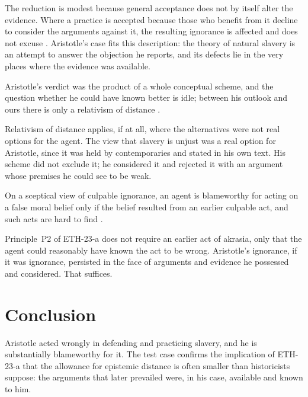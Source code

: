 \documentclass{situationist-preprint}
\begin{document}
The reduction is modest because general acceptance does not by itself alter the evidence. Where a practice is accepted because those who benefit from it decline to consider the arguments against it, the resulting ignorance is affected and does not excuse \citep{MoodyAdams1994}. Aristotle's case fits this description: the theory of natural slavery is an attempt to answer the objection he reports, and its defects lie in the very places where the evidence was available.

\begin{objection}
Aristotle's verdict was the product of a whole conceptual scheme, and the question whether he could have known better is idle; between his outlook and ours there is only a relativism of distance \citep{Williams1985}.
\end{objection}

\begin{reply}
Relativism of distance applies, if at all, where the alternatives were not real options for the agent. The view that slavery is unjust was a real option for Aristotle, since it was held by contemporaries and stated in his own text. His scheme did not exclude it; he considered it and rejected it with an argument whose premises he could see to be weak.
\end{reply}

\begin{objection}
On a sceptical view of culpable ignorance, an agent is blameworthy for acting on a false moral belief only if the belief resulted from an earlier culpable act, and such acts are hard to find \citep{Rosen2003}.
\end{objection}

\begin{reply}
Principle~P2 of ETH-23-a does not require an earlier act of akrasia, only that the agent could reasonably have known the act to be wrong. Aristotle's ignorance, if it was ignorance, persisted in the face of arguments and evidence he possessed and considered. That suffices.
\end{reply}

\section{Conclusion}

Aristotle acted wrongly in defending and practicing slavery, and he is substantially blameworthy for it. The test case confirms the implication of ETH-23-a that the allowance for epistemic distance is often smaller than historicists suppose: the arguments that later prevailed were, in his case, available and known to him.
\end{document}
